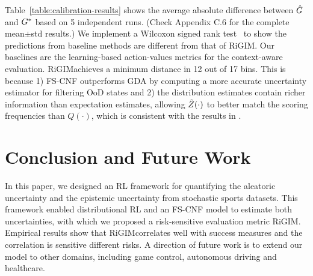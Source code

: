 \documentclass[letterpaper]{article} %
\newcommand{\sys}{RiGIM}
\newcommand{\goal}{g}
\newcommand{\system}{\sys\;}
\begin{document}
Table~\ref{table:calibration-results} shows the average absolute difference between $\hat{\MakeUppercase{\goal}}$ and $\MakeUppercase{\goal}^{*}$ based on 5 independent runs. (Check Appendix C.6 for the complete mean$\pm$std results.)
We implement a Wilcoxon signed rank test~\cite{conover1999practical} to show the predictions from baseline methods are different from that of \system.
Our baselines are the learning-based action-values metrics for the context-aware evaluation. \system achieves a minimum distance in 12 out of 17 bins. This is because 1) FS-CNF outperforms GDA by computing a more accurate uncertainty estimator for filtering OoD states and 2) the distribution estimates contain richer information than expectation estimates, allowing $\Tilde{Z}(\cdot)$ to better match the scoring frequencies than $Q(\cdot)$, which is consistent with the results in \cite{bellemare2017distributional}.


\section{Conclusion and Future Work}
In this paper, we designed an RL framework for quantifying the aleatoric uncertainty and the epistemic uncertainty from stochastic sports datasets. This framework enabled distributional RL and an FS-CNF model to estimate both uncertainties, with which we proposed a risk-sensitive evaluation metric \system. Empirical results show that \system correlates well with success measures and the correlation is sensitive different risks. A direction of future work is to extend our model to other domains, including game control, autonomous driving and healthcare.
\end{document}
